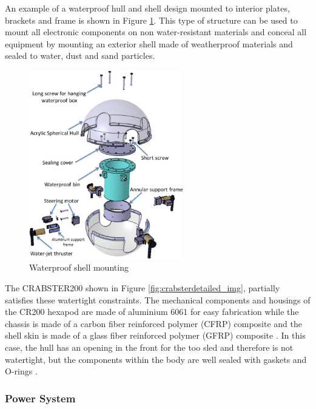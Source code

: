 An example of a waterproof hull and shell design mounted to interior plates, brackets and frame is shown in Figure \ref{fig:waterproof_shell}. This type of structure can be used to mount all electronic components on non water-resistant materials and conceal all equipment by mounting an exterior shell made of weatherproof materials and sealed to water, dust and sand particles.

\begin{figure}[H]
    \centering
    \includegraphics[width=0.6\textwidth]{Sections/LiteratureReview/img/Chasis/waterproofShell.jpg}
    \caption{Waterproof shell mounting \cite{guo_design_2017}}
    \label{fig:waterproof_shell}
\end{figure}

The CRABSTER200 shown in Figure \ref{fig:crabsterdetailed_img}, partially satisfies these watertight constraints. The mechanical components and housings of the CR200 hexapod are made of aluminium 6061 for easy fabrication while the chassis is made of a carbon fiber reinforced polymer (CFRP) composite and the shell skin is made of a glass fiber reinforced polymer (GFRP) composite \cite{shim_development_2016}\cite{yoo_design_2015}. In this case, the hull has an opening in the front for the too sled and therefore is not watertight, but the components within the body are well sealed with gaskets and O-rings \cite{shim_development_2016}.


\subsubsection{Power System}

